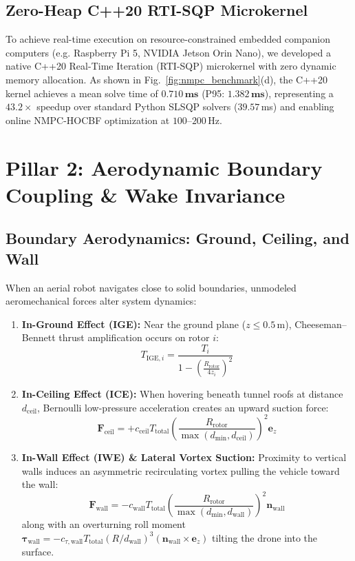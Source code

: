 \documentclass[journal,10pt]{IEEEtran}
\begin{document}
\subsection{Zero-Heap C++20 RTI-SQP Microkernel}
To achieve real-time execution on resource-constrained embedded companion computers (e.g. Raspberry Pi 5, NVIDIA Jetson Orin Nano), we developed a native C++20 Real-Time Iteration (RTI-SQP) microkernel with zero dynamic memory allocation. As shown in Fig.~\ref{fig:nmpc_benchmark}(d), the C++20 kernel achieves a mean solve time of $\mathbf{0.710\,\text{ms}}$ (P95: $\mathbf{1.382\,\text{ms}}$), representing a $\mathbf{43.2\times}$ speedup over standard Python SLSQP solvers ($39.57\,$ms) and enabling online NMPC-HOCBF optimization at $100\text{--}200\,$Hz.

\section{Pillar 2: Aerodynamic Boundary Coupling \& Wake Invariance}
\label{sec:pillar2_aerodynamics}

\subsection{Boundary Aerodynamics: Ground, Ceiling, and Wall}
When an aerial robot navigates close to solid boundaries, unmodeled aeromechanical forces alter system dynamics:
\begin{enumerate}[leftmargin=12pt]
    \item \textbf{In-Ground Effect (IGE):} Near the ground plane ($z \le 0.5\,$m), Cheeseman--Bennett thrust amplification occurs on rotor $i$:
    \begin{equation}
    T_{\text{IGE}, i} = \frac{T_i}{1 - \left(\frac{R_{\text{rotor}}}{4 z_i}\right)^2}
    \end{equation}
    \item \textbf{In-Ceiling Effect (ICE):} When hovering beneath tunnel roofs at distance $d_{\text{ceil}}$, Bernoulli low-pressure acceleration creates an upward suction force:
    \begin{equation}
    \mathbf{F}_{\text{ceil}} = +c_{\text{ceil}} T_{\text{total}} \left(\frac{R_{\text{rotor}}}{\max(d_{\text{min}}, d_{\text{ceil}})}\right)^2 \mathbf{e}_z
    \end{equation}
    \item \textbf{In-Wall Effect (IWE) \& Lateral Vortex Suction:} Proximity to vertical walls induces an asymmetric recirculating vortex pulling the vehicle toward the wall:
    \begin{equation}
    \mathbf{F}_{\text{wall}} = -c_{\text{wall}} T_{\text{total}} \left(\frac{R_{\text{rotor}}}{\max(d_{\text{min}}, d_{\text{wall}})}\right)^2 \mathbf{n}_{\text{wall}}
    \end{equation}
    along with an overturning roll moment $\boldsymbol{\tau}_{\text{wall}} = -c_{\tau, \text{wall}} T_{\text{total}} (R/d_{\text{wall}})^3 (\mathbf{n}_{\text{wall}} \times \mathbf{e}_z)$ tilting the drone into the surface.
\end{enumerate}
\end{document}
